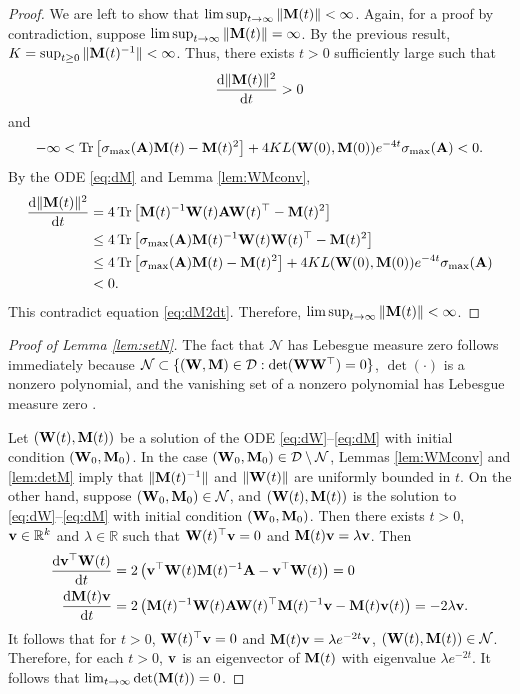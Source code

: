 \documentclass[11pt]{article}
\theoremstyle{definition}
\DeclareMathOperator{\tr}{Tr}
\newcommand{\dd}{\operatorname{d}\!}
\newcommand{\inv}{^{-1}}
\renewcommand{\v}{{\bf v}}
\newcommand{\A}{{\bf A}}
\newcommand{\M}{{\bf M}}
\newcommand{\R}{\mathbb{R}}
\newcommand{\W}{{\bf W}}
\newcommand{\calD}{\mathcal{D}}
\newcommand{\calN}{\mathcal{N}}
\begin{document}
\begin{proof}
    We are left to show that $\limsup_{t\to\infty}\|\M(t)\|<\infty$. Again, for a proof by contradiction, suppose $\limsup_{t\to\infty}\|\M(t)\|=\infty$. 
    By the previous result, $K=\sup_{t\ge0}\|\M(t)^{-1}\|<\infty$.
    Thus, there exists $t>0$ sufficiently large such that
    \begin{align}\label{eq:dM2dt}
        \frac{\dd\|\M(t)\|^2}{\dd t}>0
    \end{align}
    and
    \begin{align*}
        -\infty<\tr\left[\sigma_{\max}(\A)\M(t) -\M(t)^2\right]+ 4KL(\W(0),\M(0)) e^{-4t}\sigma_{\max}(\A)<0.
    \end{align*}
    By the ODE \eqref{eq:dM} and Lemma \ref{lem:WMconv},
    \begin{align*}
        \frac{\dd\|\M(t)\|^2}{\dd t} &=4\tr\left[\M(t)\inv\W(t)\A\W(t)^\top-\M(t)^2\right]   \\
        &\leq 4\tr\left[\sigma_{\max}(\A)\M(t)\inv\W(t)\W(t)^\top-\M(t)^2\right]  \\
        &\leq 4\tr\left[\sigma_{\max}(\A)\M(t) -\M(t)^2\right]+ 4KL(\W(0),\M(0)) e^{-4t}\sigma_{\max}(\A)\\
        &<0.
    \end{align*}
    This contradict equation \eqref{eq:dM2dt}.
    Therefore, $\limsup_{t\to\infty}\|\M(t)\|<\infty$.
\end{proof}

\begin{proof}[Proof of Lemma \ref{lem:setN}]
    The fact that $\calN$ has Lebesgue measure zero follows immediately because $\calN\subset\{(\W,\M)\in\calD:\det(\W\W^\top)=0\}$, $\det(\cdot)$ is a nonzero polynomial, and the vanishing set of a nonzero polynomial has Lebesgue measure zero \citep{caron2005zero}. 

    Let $(\W(t),\M(t))$ be a solution of the ODE \eqref{eq:dW}--\eqref{eq:dM} with initial condition $(\W_0,\M_0)$.
    In the case $(\W_0,\M_0)\in\calD\setminus\calN$, Lemmas \ref{lem:WMconv} and \ref{lem:detM} imply that $\|\M(t)^{-1}\|$ and $\|\W(t)\|$ are uniformly bounded in $t$.
    On the other hand, suppose $(\W_0,\M_0)\in\calN$, and $(\W(t),\M(t))$ is the solution to \eqref{eq:dW}--\eqref{eq:dM} with initial condition $(\W_0,\M_0)$.  Then there exists $t>0$, $\v\in\R^k$ and $\lambda\in\R$ such that $\W(t)^\top\v=0$ and $\M(t)\v=\lambda\v$.
    Then
    \begin{align*}
        \frac{\dd \v^\top\W(t)}{\dd t}&=2\left(\v^\top\W(t)\M(t)\inv\A-\v^\top\W(t)\right)=0\\
        \frac{\dd \M(t)\v}{\dd t}&=2\left(\M(t)\inv\W(t)\A\W(t)^\top\M(t)\inv\v-\M(t)\v(t)\right)=-2\lambda\v.
    \end{align*}
    It follows that for $t>0$, $\W(t)^\top\v=0$ and $\M(t)\v=\lambda e^{-2t}\v$, $(\W(t),\M(t))\in\calN$. Therefore, for each $t>0$, $\v$ is an eigenvector of $\M(t)$ with eigenvalue $\lambda e^{-2t}$. 
    It follows that $\lim_{t\to\infty}\det(\M(t))=0$. 
\end{proof}
\end{document}
